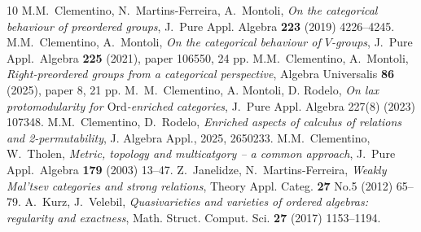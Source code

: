 \documentclass[11pt]{amsart}
\theoremstyle{plain}
\theoremstyle{definition}
\theoremstyle{remark}
\begin{document}
\begin{thebibliography}{10}
 M.M.~Clementino, N.~Martins-Ferreira, A.~Montoli, \emph{On the categorical behaviour of preordered groups}, {J.~Pure} Appl. Algebra \textbf{223} (2019) 4226--4245.
 M.M.~Clementino, A.~Montoli, \emph{On the categorical behaviour of $V$-groups}, J.~Pure Appl.~Algebra \textbf{225} (2021), paper 106550, 24 pp.
 M.M.~Clementino, A.~Montoli, \emph{Right-preordered groups from a categorical perspective}, Algebra Universalis \textbf{86} (2025), paper 8, 21 pp.
  M.~M.~Clementino, A. Montoli, D. Rodelo, \emph{On lax protomodularity for $\mathrm{Ord}$-enriched categories}, {J.~Pure} Appl. Algebra 227(8) (2023) 107348.
 M.M.~Clementino, D.~Rodelo, \emph{Enriched aspects of calculus of relations and 2-permutability}, J. Algebra Appl., 2025, 2650233.
 M.M.~Clementino, W.~Tholen, \emph{Metric, topology and multicatgory -- a common approach}, J.~Pure Appl.~Algebra \textbf{179} (2003) 13--47.
 Z.~Janelidze, N.~Martins-Ferreira, \emph{Weakly Mal'tsev categories and strong relations}, Theory Appl. Categ. \textbf{27} No.5 (2012) 65--79.
 A.~Kurz, J.~Velebil, \emph{Quasivarieties and varieties of ordered algebras: regularity and exactness}, Math. Struct. Comput. Sci. \textbf{27} (2017) 1153--1194.

\end{thebibliography}
\end{document}
